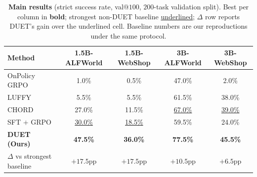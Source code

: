 
\begin{table}[t]
\centering
\caption{\textbf{Main results} (strict success rate, val@$100$, $200$-task validation split). Best per column in \textbf{bold}; strongest non-DUET baseline \underline{underlined}; $\Delta$ row reports DUET's gain over the underlined cell. Baseline numbers are our reproductions under the same protocol.}
\label{tab:main_results}
\setlength{\tabcolsep}{4pt}
\renewcommand{\arraystretch}{1.02}
\begin{tabular}{lcccc}
\toprule
\textbf{Method} & \textbf{1.5B-ALFWorld} & \textbf{1.5B-WebShop} & \textbf{3B-ALFWorld} & \textbf{3B-WebShop} \\
\midrule
OnPolicy GRPO       & \phantom{0}1.0\%   & \phantom{0}0.5\%   & 47.0\%             & \phantom{0}2.0\%   \\
LUFFY               & \phantom{0}5.5\%   & \phantom{0}5.5\%   & 61.5\%             & 38.0\%             \\
CHORD               & 27.0\%             & 11.5\%             & \underline{67.0\%} & \underline{39.0\%} \\
SFT $+$ GRPO        & \underline{30.0\%} & \underline{18.5\%} & 59.5\%             & 24.0\%             \\
\midrule
\rowcolor{gray!12}
\textbf{DUET (Ours)} & \textbf{47.5\%}   & \textbf{36.0\%}    & \textbf{77.5\%}    & \textbf{45.5\%}    \\
\midrule
$\Delta$ vs strongest baseline & $+17.5$pp & $+17.5$pp & $+10.5$pp & $+6.5$pp \\
\bottomrule
\end{tabular}
\end{table}

